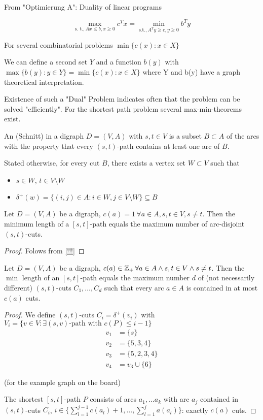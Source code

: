 From "Optimierung A": Duality of linear programs

\[\max_{\text{s. t.}, Ax \leq b, x \geq 0} c^Tx = \min_{\text{s.t.}, A^T y \geq c, y \geq 0} b^T y\]

For several combinatorial problems $\min\{c(x): x \in X\}$

We can define a second set $Y$ and a function $b(y)$ with $\max\{b(y): y \in Y \} = \min \{ c(x): x \in X\}$ where Y and b(y) have a graph theoretical interpretation. 

Existence of such a "Dual" Problem indicates often that the problem can be solved "efficiently". For the shortest path problem several max-min-theorems exist.

\begin{defn}
An  (Schnitt) in a digraph $D=(V,A)$ with $s,t \in V$ is a subset $B \subset A$ of the arcs with the property that every $(s,t)$-path contains at least one arc of $B$.

Stated  otherwise, for every cut $B$, there exists a vertex set $W \subset V$ such that
\begin{itemize}
	\item $s \in W$, $t \in V \setminus W$
	\item $\delta^+(w) = \{(i,j) \in A: i \in W, j \in V \setminus W\} \subseteq B$
\end{itemize}
\end{defn}

\begin{thm}
	Let $D=(V,A)$ be a digraph, $c(a)=1 \, \forall a \in A, s,t \in V, s \neq t$. Then the minimum length of a $[s,t]$-path equals the maximum number of arc-disjoint $(s,t)$-cuts. 
\end{thm}

\begin{proof}
	Folows from \ref{!!!} %
\end{proof}

\begin{thm} %
	Let $D=(V,A)$ be a digraph, $c(a) \in \mathbb{Z}_+ \, \forall a \in A \wedge s,t \in V \wedge s\neq t$. Then the $\min$ length of an $[s,t]$-path equals the maximum number $d$ of (not necessarily different) $(s,t)$-cuts $C_1, …, C_d$ such that every arc $a \in A$ is contained in at most $c(a)$ cuts.
\end{thm}

\begin{proof}
	We define $(s, t)$-cuts $C_i = \delta^+(v_i)$ with $V_i=\{v \in V: \exists \text{$(s,v)$-path with $c(P)\leq i-1$}\}$
	\begin{align*}
		v_1 & = \{s\} \\
		v_2 & = \{5,3,4\} \\
		v_3 & = \{5,2,3,4\} \\
		v_4 & = v_3 \cup \{ 6 \}
	\end{align*}
	
	(for the example graph on the board)
	
	The shortest $[s,t]$-path $P$ consists of arcs $a_1, … a_k$ with arc $a_j$ contained in $(s,t)$-cuts $C_i$,  $i \in \{\sum_{l=1}^{j-1} c(a_l) + 1, …, \sum_{l=1}^j a(a_l)\}$: exactly $c(a)$ cuts.
\end{proof}	

